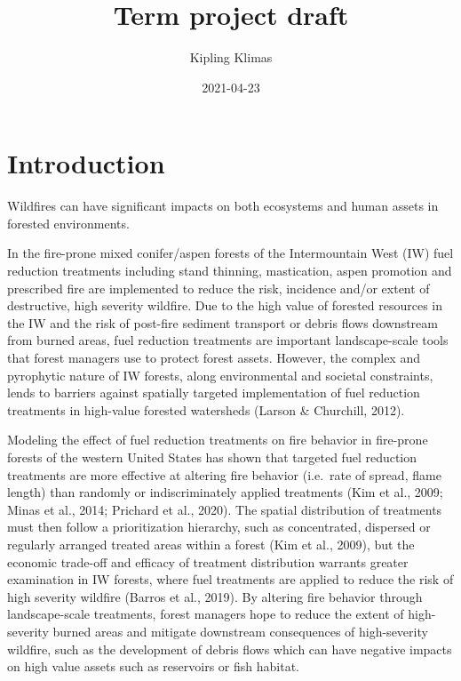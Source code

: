 \documentclass[]{book}
\title{Term project draft}
\author{Kipling Klimas}
\date{2021-04-23}
\begin{document}
\maketitle

{
\setcounter{tocdepth}{1}
\tableofcontents
}
\hypertarget{introduction}{%
\chapter{Introduction}\label{introduction}}

Wildfires can have significant impacts on both ecosystems and human assets in forested environments.

In the fire-prone mixed conifer/aspen forests of the Intermountain West (IW) fuel reduction treatments including stand thinning, mastication, aspen promotion and prescribed fire are implemented to reduce the risk, incidence and/or extent of destructive, high severity wildfire. Due to the high value of forested resources in the IW and the risk of post-fire sediment transport or debris flows downstream from burned areas, fuel reduction treatments are important landscape-scale tools that forest managers use to protect forest assets. However, the complex and pyrophytic nature of IW forests, along environmental and societal constraints, lends to barriers against spatially targeted implementation of fuel reduction treatments in high-value forested watersheds (Larson \& Churchill, 2012).

Modeling the effect of fuel reduction treatments on fire behavior in fire-prone forests of the western United States has shown that targeted fuel reduction treatments are more effective at altering fire behavior (i.e.~rate of spread, flame length) than randomly or indiscriminately applied treatments (Kim et al., 2009; Minas et al., 2014; Prichard et al., 2020). The spatial distribution of treatments must then follow a prioritization hierarchy, such as concentrated, dispersed or regularly arranged treated areas within a forest (Kim et al., 2009), but the economic trade-off and efficacy of treatment distribution warrants greater examination in IW forests, where fuel treatments are applied to reduce the risk of high severity wildfire (Barros et al., 2019). By altering fire behavior through landscape-scale treatments, forest managers hope to reduce the extent of high-severity burned areas and mitigate downstream consequences of high-severity wildfire, such as the development of debris flows which can have negative impacts on high value assets such as reservoirs or fish habitat.
\end{document}
